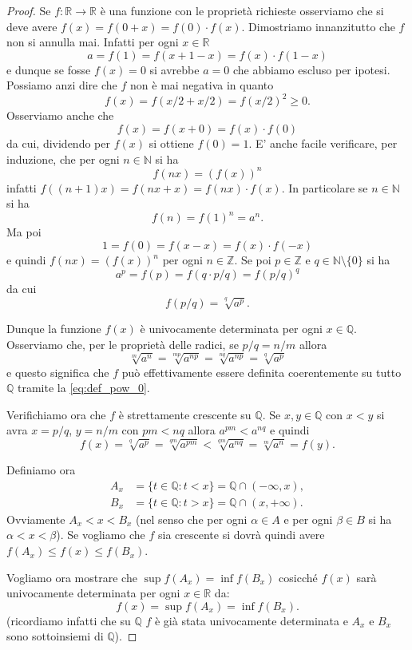 \documentclass[italian,a4paper,oneside,headinclude]{scrbook}
\newcommand{\NN}{\mathbb N}
\newcommand{\QQ}{\mathbb Q}
\newcommand{\RR}{\mathbb R}
\newcommand{\ZZ}{\mathbb Z}
\begin{document}
\begin{proof}
Se $f\colon \RR \to \RR$ è una funzione con le proprietà richieste
osserviamo che si deve avere $f(x) = f(0+x) = f(0)\cdot f(x)$.
Dimostriamo innanzitutto che $f$ non si annulla mai.
Infatti per ogni $x\in \RR$
\[
   a = f(1) = f(x+1-x) = f(x)\cdot f(1-x)
\]
e dunque se fosse $f(x)=0$ si avrebbe $a=0$ che abbiamo escluso per ipotesi.
Possiamo anzi dire che $f$ non è mai negativa in quanto
\[
  f(x) = f(x/2 + x/2) = f(x/2)^2 \ge 0.
\]
Osserviamo anche che
\[
  f(x) = f(x+0) = f(x)\cdot f(0)
\]
da cui, dividendo per $f(x)$ si ottiene $f(0)=1$.
E' anche facile verificare, per induzione, che
per ogni $n\in \NN$ si ha
\[
 f(nx) = (f(x))^n
\]
infatti $f((n+1)x) = f(nx+x)=f(nx)\cdot f(x)$.
In particolare se $n\in \NN$ si ha
\[
  f(n) = f(1)^n = a^n.
\]
Ma poi
\[
1=f(0) = f(x-x) = f(x)\cdot f(-x)
\]
e quindi $f(nx) = (f(x))^n$ per ogni $n\in \ZZ$.
Se poi $p\in \ZZ$ e $q \in \NN\setminus\{0\}$ si ha
\[
 a^p = f(p) = f(q\cdot p/q) = f(p/q)^q
\]
da cui
\begin{equation}\label{eq:def_pow_0}
 f(p/q) = \sqrt[q]{a^p}.
\end{equation}

Dunque la funzione $f(x)$ è univocamente determinata per ogni $x\in \QQ$.
Osserviamo che, per le proprietà delle radici, se $p/q = n/m$ allora
\[
 \sqrt[m]{a^n}
 = \sqrt[mp]{a^{np}}
 = \sqrt[nq]{a^{np}}
 = \sqrt[q]{a^p}
\]
e questo significa che $f$ può effettivamente essere definita
coerentemente su tutto $\QQ$
tramite
la \eqref{eq:def_pow_0}.

Verifichiamo ora che $f$ è strettamente crescente su $\QQ$.
Se $x,y \in \QQ$
con $x<y$ si avra $x=p/q$, $y=n/m$ con $pm < nq$ allora
$a^{pm} < a^{nq}$ e quindi
\[
f(x)
= \sqrt[q]{a^p}
= \sqrt[qm]{a^{pm}}
< \sqrt[qm]{a^{nq}}
= \sqrt[m]{a^n}
= f(y).
\]

Definiamo ora
\begin{align*}
  A_x &= \{t\in \QQ\colon t<x\} = \QQ \cap (-\infty,x),
  \\
  B_x &= \{t\in \QQ\colon t>x\} = \QQ \cap (x,+\infty).
\end{align*}
Ovviamente $A_x < x < B_x$ (nel senso che per ogni $\alpha \in A$
e per ogni $\beta \in B$ si ha $\alpha < x < \beta$).
Se vogliamo che $f$ sia crescente si dovrà quindi avere
$f(A_x) \le f(x) \le f(B_x)$.

Vogliamo ora mostrare che $\sup f(A_x) = \inf f(B_x)$
cosicché $f(x)$ sarà univocamente determinata
per ogni $x\in \RR$ da:
\begin{equation}\label{eq:def_pow_2}
  f(x) = \sup f(A_x) = \inf f(B_x).
\end{equation}
(ricordiamo infatti che su $\QQ$ $f$ è già stata univocamente determinata
e $A_x$ e $B_x$ sono sottoinsiemi di $\QQ$).


\end{proof}
\end{document}
